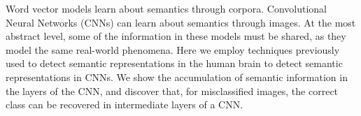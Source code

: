 Word vector models learn about semantics through corpora.  Convolutional Neural Networks (CNNs) can learn about semantics through images.  At the most abstract level, some of the information in these models must be shared, as they model the same real-world phenomena.  Here we employ techniques previously used to detect semantic representations in the human brain to detect semantic representations in CNNs.  We show the accumulation of semantic information in the layers of the CNN, and discover that, for misclassified images, the correct class can be recovered in intermediate layers of a CNN.
